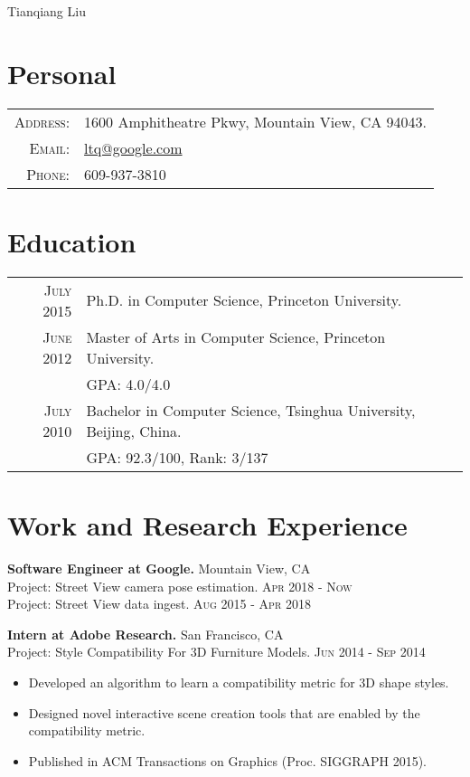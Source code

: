 \documentclass[letterpaper,10pt]{article}
\begin{document}
\pagestyle{empty}

\par{\centering
{\huge Tianqiang Liu }
\bigskip\par}

\section{Personal}
\begin{tabular}{rl}
\textsc{Address:} & 1600 Amphitheatre Pkwy, Mountain View, CA 94043.\\
\textsc{Email:}	& \href{mailto:ltq@google.com}{ltq@google.com}\\
\textsc{Phone:} & 609-937-3810
\end{tabular}

\section{Education}
\begin{tabular}{rl}
\textsc{July} 2015
  & Ph.D. in Computer Science, Princeton University.
\vspace{0.05in}\\

\textsc{June} 2012 
  & Master of Arts in Computer Science, Princeton University.\\
  & GPA: 4.0/4.0
\vspace{0.05in}\\

\textsc{July} 2010
  & Bachelor in Computer Science, Tsinghua University, Beijing, China.\\
  & GPA: 92.3/100, Rank: 3/137 \\
\end{tabular}

\section{Work and Research Experience}
\textbf{Software Engineer at Google.}  \hfill Mountain View, CA\\
Project: Street View camera pose estimation. \hfill \textsc{Apr} 2018 - \textsc{Now}\\
Project: Street View data ingest. \hfill \textsc{Aug} 2015 - \textsc{Apr} 2018
\vspace{0.06in}

\textbf{Intern at Adobe Research.}  \hfill San Francisco, CA\\
Project: Style Compatibility For 3D Furniture Models.  \hfill \textsc{Jun} 2014 - \textsc{Sep} 2014
\begin{itemize}
    \item Developed an algorithm to learn a compatibility metric for 3D shape styles.
    \item Designed novel interactive scene creation tools that are enabled by the compatibility metric.
    \item Published in ACM Transactions on Graphics (Proc. SIGGRAPH 2015).
\end{itemize}
\vspace{0.06in}
\end{document}
